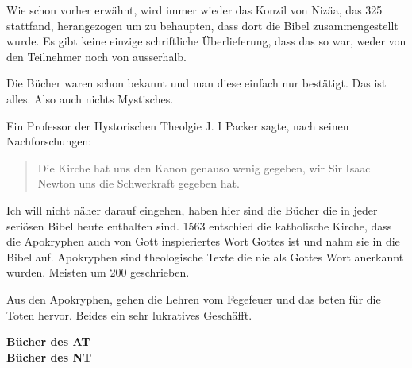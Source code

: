 \documentclass[fontsize=16pt]{mybib}
\begin{document}
\begin{otsblock}
    Wie schon vorher erwähnt, wird immer wieder das Konzil von Nizäa, das 325 \nChr{} stattfand, herangezogen um zu behaupten, dass dort die Bibel zusammengestellt wurde. Es gibt keine einzige schriftliche Überlieferung, dass das so war, weder von den Teilnehmer noch von ausserhalb.

    Die Bücher waren schon bekannt und man diese einfach nur bestätigt.
    Das ist alles. Also auch nichts Mystisches.

    Ein Professor der Hystorischen Theolgie J. I Packer sagte, nach seinen Nachforschungen:
    \begin{quote}
        Die Kirche hat uns den Kanon genauso wenig gegeben, wir Sir Isaac Newton uns die Schwerkraft gegeben hat.
    \end{quote}
\end{otsblock}
\begin{otsblock}
    Ich will nicht näher darauf eingehen, haben hier sind die Bücher die in jeder seriösen Bibel heute enthalten sind. 1563 entschied die katholische Kirche, dass die Apokryphen auch von Gott inspieriertes Wort Gottes ist und nahm sie in die Bibel auf. Apokryphen sind theologische Texte die nie als Gottes Wort anerkannt wurden. Meisten um 200 \vChr{} geschrieben.

    Aus den Apokryphen, gehen die Lehren vom Fegefeuer und das beten für die Toten hervor. Beides ein sehr lukratives Geschäfft.

    \textbf{Bücher des AT}\\
    \textbf{Bücher des NT}
\end{otsblock}
\end{document}
